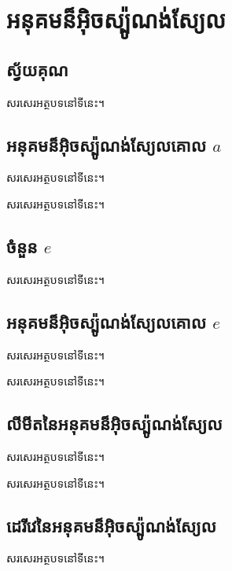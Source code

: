 \documentclass[8pt,a4paper,twocolumn]{book}
\begin{document}
	\chapter{អនុគមន៏អ៊ិចស្ប៉ូណង់ស្យែល}
	\section{ស្វ័យគុណ}
	\begin{definition}{}{}
		សរសេរអត្ថបទនៅទីនេះ។
	\end{definition}
	\section{អនុគមន៏អ៊ិចស្ប៉ូណង់ស្យែលគោល $ a $}
	\begin{definition}{}{}
		សរសេរអត្ថបទនៅទីនេះ។
	\end{definition}
	\begin{property}{}{}
		សរសេរអត្ថបទនៅទីនេះ។
	\end{property}
	\section{ចំនួន $ e $}
	\begin{definition}{}{}
		សរសេរអត្ថបទនៅទីនេះ។
	\end{definition}
	\section{អនុគមន៏អ៊ិចស្ប៉ូណង់ស្យែលគោល $ e $}
	\begin{definition}{}{}
		សរសេរអត្ថបទនៅទីនេះ។
	\end{definition}
	\begin{property}{}{}
		សរសេរអត្ថបទនៅទីនេះ។
	\end{property}
	\section{លីមីតនៃអនុគមន៏អ៊ិចស្ប៉ូណង់ស្យែល}
	\begin{theorem}{}{}
		សរសេរអត្ថបទនៅទីនេះ។
	\end{theorem}
	\begin{property}{}{}
		សរសេរអត្ថបទនៅទីនេះ។
	\end{property}
	\section{ដេរីវេនៃអនុគមន៏អ៊ិចស្ប៉ូណង់ស្យែល}
	\begin{property}{}{}
		សរសេរអត្ថបទនៅទីនេះ។
	\end{property}
\end{document}
